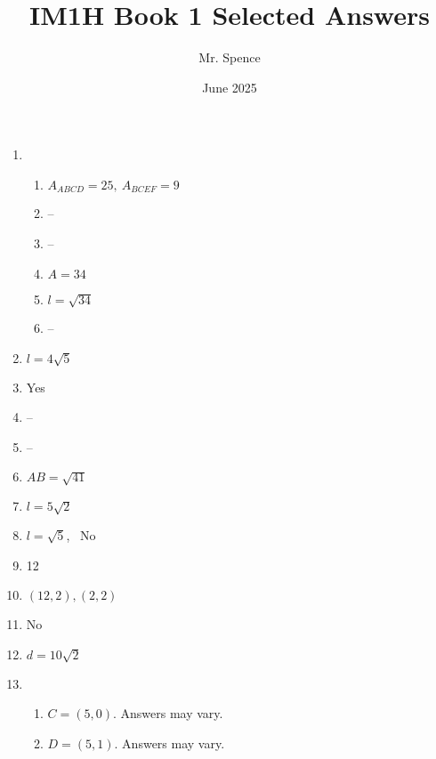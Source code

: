 \documentclass{article}
\title{IM1H Book 1 Selected Answers}
\author{Mr. Spence}
\date{June 2025}
\begin{document}
\maketitle

\begin{enumerate}

\item

	\begin{enumerate}
	
 	\item $A_{ABCD} = 25, \ A_{BCEF} = 9$
	
	\item --
	
	\item --
	
	\item $A = 34$
	
	\item $l = \sqrt{34}$
	
	\item --
	
	\end{enumerate}
	
\item $l = 4\sqrt{5}$

\item Yes

\item --

\item --

\item $AB = \sqrt{41}$

\item $l = 5\sqrt{2}$

\item $l = \sqrt{5}$, \ No

\item 12

\item $(12, 2), (2, 2)$

\item No

\item $d = 10\sqrt{2}$

\item

	\begin{enumerate}
	
	\item $C = (5, 0).$ Answers may vary.
	
	\item $D = (5, 1).$ Answers may vary.
	

\end{enumerate}
\end{enumerate}
\end{document}
